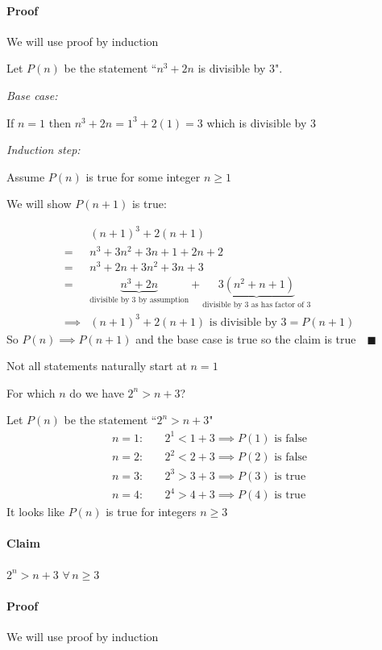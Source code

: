 \documentclass{article}
\newcommand{\A}{\,\forall\,}
\begin{document}
\paragraph{Proof} We will use proof by induction

Let \(P(n)\) be the statement ``\(n^3+2n\) is divisible by 3".

\emph{Base case:}

If \(n=1\) then \(n^3+2n=1^3+2(1)=3\) which is divisible by 3

\emph{Induction step:}

Assume \(P(n)\) is true for some integer \(n\ge 1\)

We will show \(P(n+1)\) is true:

\begin{align*}
&(n+1)^3+2(n+1)\\
=&n^3+3n^2+3n+1+2n+2\\
=&n^3+2n+3n^2+3n+3\\
=&\underbrace{n^3+2n}_{\text{divisible by 3 by assumption}}+\underbrace{3(n^2+n+1)}_{\text{divisible by 3 as has factor of 3}}\\
\implies&(n+1)^3+2(n+1)\text{ is divisible by 3}=P(n+1)
\end{align*}
So \(P(n)\implies P(n+1)\) and the base case is true so the claim is true\(\quad\blacksquare\)

Not all statements naturally start at \(n=1\)

For which \(n\) do we have \(2^n>n+3\)?

Let \(P(n)\) be the statement ``\(2^n>n+3\)"
\begin{align*}
n=1:\quad&2^1<1+3\implies P(1)\text{ is false}\\
n=2:\quad&2^2<2+3\implies P(2)\text{ is false}\\
n=3:\quad&2^3>3+3\implies P(3)\text{ is true}\\
n=4:\quad&2^4>4+3\implies P(4)\text{ is true}
\end{align*}
It looks like \(P(n)\) is true for integers \(n\ge 3\)

\paragraph{Claim} \(2^n>n+3\,\A n\ge 3\)

\paragraph{Proof} We will use proof by induction
\end{document}
